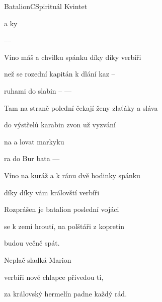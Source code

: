 \setcounter{page}{8}
\begin{song}{Batalion}{C}{Spirituál Kvintet}

\begin{SBChorus}
  a ky

  ---- 

Víno máš a chvilku spánku díky díky verbíři
\end{SBChorus}
\begin{SBVerse}
 než se rozední kapitán k dlání kaz --

ruhami do slabin -- ----

Tam na straně polední čekají ženy zlaťáky a sláva

do výstřelů karabin zvon už vyzvání
\end{SBVerse}
\begin{SBChorus}
 na  a lovat markyku

ra do Bur bata ----

Víno na kuráž a k ránu dvě hodinky spánku

díky díky vám královští verbíři

\end{SBChorus}
\begin{SBVerse}
Rozprášen je batalion poslední vojáci

se k zemi hroutí, na polštáři z kopretin

budou večně spát.

Neplač sladká Marion

verbíři nové chlapce přivedou ti,

za královský hermelín padne každý rád.
\end{SBVerse}
\end{song}
\pagebreak
